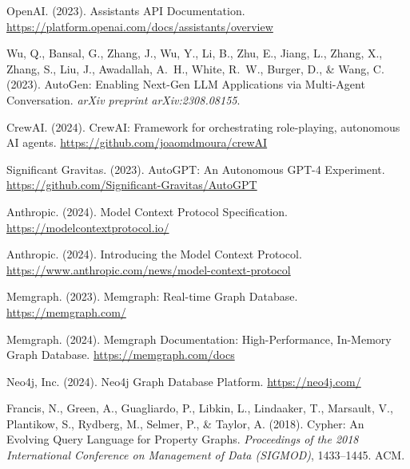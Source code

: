 OpenAI. (2023). Assistants API Documentation. \url{https://platform.openai.com/docs/assistants/overview}

Wu, Q., Bansal, G., Zhang, J., Wu, Y., Li, B., Zhu, E., Jiang, L., Zhang, X., Zhang, S., Liu, J., Awadallah, A.~H., White, R.~W., Burger, D., \& Wang, C. (2023). AutoGen: Enabling Next-Gen LLM Applications via Multi-Agent Conversation. \textit{arXiv preprint arXiv:2308.08155}.

CrewAI. (2024). CrewAI: Framework for orchestrating role-playing, autonomous AI agents. \url{https://github.com/joaomdmoura/crewAI}

Significant Gravitas. (2023). AutoGPT: An Autonomous GPT-4 Experiment. \url{https://github.com/Significant-Gravitas/AutoGPT}


Anthropic. (2024). Model Context Protocol Specification. \url{https://modelcontextprotocol.io/}

Anthropic. (2024). Introducing the Model Context Protocol. \url{https://www.anthropic.com/news/model-context-protocol}


Memgraph. (2023). Memgraph: Real-time Graph Database. \url{https://memgraph.com/}

Memgraph. (2024). Memgraph Documentation: High-Performance, In-Memory Graph Database. \url{https://memgraph.com/docs}

Neo4j, Inc. (2024). Neo4j Graph Database Platform. \url{https://neo4j.com/}

Francis, N., Green, A., Guagliardo, P., Libkin, L., Lindaaker, T., Marsault, V., Plantikow, S., Rydberg, M., Selmer, P., \& Taylor, A. (2018). Cypher: An Evolving Query Language for Property Graphs. \textit{Proceedings of the 2018 International Conference on Management of Data (SIGMOD)}, 1433--1445. ACM.


